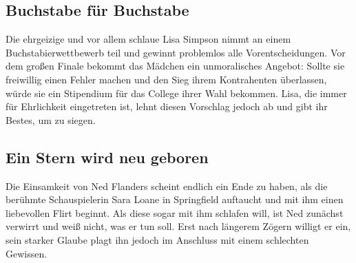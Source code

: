 \subsection{Buchstabe für Buchstabe}\label{EABF07}
Die ehrgeizige und vor allem schlaue Lisa Simpson nimmt an einem Buchstabierwettbewerb teil und gewinnt problemlos alle Vorentscheidungen. Vor dem großen Finale bekommt das Mädchen ein unmoralisches Angebot: Sollte sie freiwillig einen Fehler machen und den Sieg ihrem Kontrahenten überlassen, würde sie ein Stipendium für das College ihrer Wahl bekommen. Lisa, die immer für Ehrlichkeit eingetreten ist, lehnt diesen Vorschlag jedoch ab und gibt ihr Bestes, um zu siegen.


\subsection{Ein Stern wird neu geboren}\label{EABF08}
Die Einsamkeit von Ned Flanders scheint endlich ein Ende zu haben, als die berühmte Schauspielerin Sara Loane in Springfield auftaucht und mit ihm einen liebevollen Flirt beginnt. Als diese sogar mit ihm schlafen will, ist Ned zunächst verwirrt und weiß nicht, was er tun soll. Erst nach längerem Zögern willigt er ein, sein starker Glaube plagt ihn jedoch im Anschluss mit einem schlechten Gewissen.


